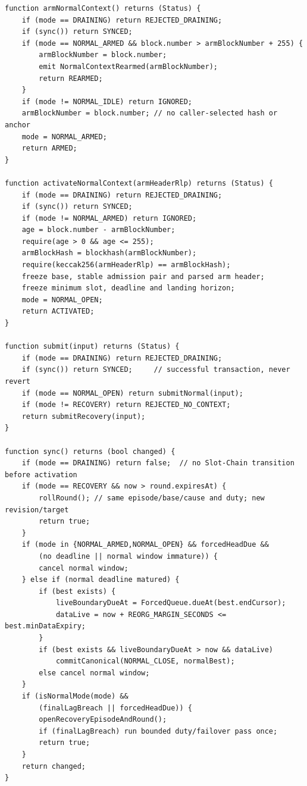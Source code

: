 \documentclass[a4paper,11pt]{article}
\begin{document}
\begin{verbatim}
function armNormalContext() returns (Status) {
    if (mode == DRAINING) return REJECTED_DRAINING;
    if (sync()) return SYNCED;
    if (mode == NORMAL_ARMED && block.number > armBlockNumber + 255) {
        armBlockNumber = block.number;
        emit NormalContextRearmed(armBlockNumber);
        return REARMED;
    }
    if (mode != NORMAL_IDLE) return IGNORED;
    armBlockNumber = block.number; // no caller-selected hash or anchor
    mode = NORMAL_ARMED;
    return ARMED;
}

function activateNormalContext(armHeaderRlp) returns (Status) {
    if (mode == DRAINING) return REJECTED_DRAINING;
    if (sync()) return SYNCED;
    if (mode != NORMAL_ARMED) return IGNORED;
    age = block.number - armBlockNumber;
    require(age > 0 && age <= 255);
    armBlockHash = blockhash(armBlockNumber);
    require(keccak256(armHeaderRlp) == armBlockHash);
    freeze base, stable admission pair and parsed arm header;
    freeze minimum slot, deadline and landing horizon;
    mode = NORMAL_OPEN;
    return ACTIVATED;
}

function submit(input) returns (Status) {
    if (mode == DRAINING) return REJECTED_DRAINING;
    if (sync()) return SYNCED;     // successful transaction, never revert
    if (mode == NORMAL_OPEN) return submitNormal(input);
    if (mode != RECOVERY) return REJECTED_NO_CONTEXT;
    return submitRecovery(input);
}

function sync() returns (bool changed) {
    if (mode == DRAINING) return false;  // no Slot-Chain transition before activation
    if (mode == RECOVERY && now > round.expiresAt) {
        rollRound(); // same episode/base/cause and duty; new revision/target
        return true;
    }
    if (mode in {NORMAL_ARMED,NORMAL_OPEN} && forcedHeadDue &&
        (no deadline || normal window immature)) {
        cancel normal window;
    } else if (normal deadline matured) {
        if (best exists) {
            liveBoundaryDueAt = ForcedQueue.dueAt(best.endCursor);
            dataLive = now + REORG_MARGIN_SECONDS <= best.minDataExpiry;
        }
        if (best exists && liveBoundaryDueAt > now && dataLive)
            commitCanonical(NORMAL_CLOSE, normalBest);
        else cancel normal window;
    }
    if (isNormalMode(mode) &&
        (finalLagBreach || forcedHeadDue)) {
        openRecoveryEpisodeAndRound();
        if (finalLagBreach) run bounded duty/failover pass once;
        return true;
    }
    return changed;
}
\end{verbatim}
\end{document}

